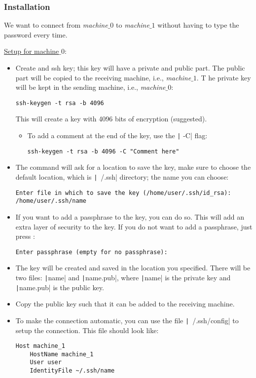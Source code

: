 \subsubsection{Installation}

We want to connect from \textit{machine$\_0$} to \textit{machine$\_1$} without having to type
the password every time.\bigbreak

\underline{\underline{Setup for machine$\_0$}}:

\begin{itemize}
    \item Create and ssh key; this key will have a private and public part.
    The public part will be copied to the receiving machine, i.e.,
    \textit{machine$\_1$}. T he private key will be kept in the sending machine,
    i.e., \textit{machine$\_0$}:
    \begin{verbatim}
ssh-keygen -t rsa -b 4096
    \end{verbatim}
    This will create a key with 4096 bits of encryption (suggested).
    \begin{itemize}
        \item To add a comment at the end of the key, use the 
        \texttt| -C| flag:
        \begin{verbatim}
ssh-keygen -t rsa -b 4096 -C "Comment here"
        \end{verbatim}
    \end{itemize}
    \item The command will ask for a location to save the key, make sure to
    choose the default location, which is \texttt|~/.ssh| directory;
    the name you can choose:
    \begin{verbatim}
Enter file in which to save the key (/home/user/.ssh/id_rsa): /home/user/.ssh/name
    \end{verbatim}
    \item If you want to add a passphrase to the key, you can do so. This will
    add an extra layer of security to the key. If you do not want to add a
    passphrase, just press :
    \begin{verbatim}
Enter passphrase (empty for no passphrase):
    \end{verbatim}
    \item The key will be created and saved in the location you specified. There
    will be two files: \texttt|name| and \texttt|name.pub|,
    where \texttt|name| is the private key and
    \texttt|name.pub| is the public key.
    \item Copy the public key such that it can be added to the receiving
    machine.
    \item To make the connection automatic, you can use the file 
    \texttt|~/.ssh/config| to setup the connection. This file should
    look like:
    \begin{verbatim}
Host machine_1
    HostName machine_1
    User user
    IdentityFile ~/.ssh/name
    \end{verbatim}
\end{itemize}

